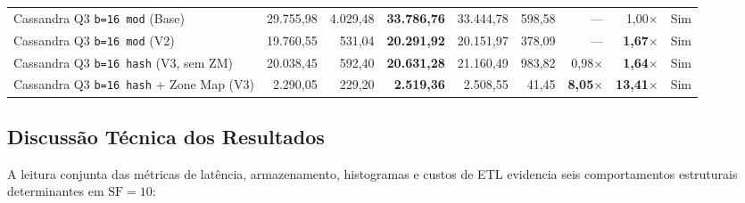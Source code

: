 \documentclass[12pt,a4paper]{article}
\begin{document}
\begin{table}[H]
\begin{adjustbox}{max width=\textwidth}
\begin{tabular}{lrrrrrrrc}
\midrule
Cassandra Q3 \texttt{b=16 mod} (Base) & 29.755,98 & 4.029,48 & \textbf{33.786,76} & 33.444,78 & 598,58 & --- & 1,00$\times$ & Sim \\
Cassandra Q3 \texttt{b=16 mod} (V2)   & 19.760,55 & 531,04   & \textbf{20.291,92} & 20.151,97 & 378,09 & --- & \textbf{1,67$\times$} & Sim \\
Cassandra Q3 \texttt{b=16 hash} (V3, sem ZM) & 20.038,45 & 592,40 & \textbf{20.631,28} & 21.160,49 & 983,82 & 0,98$\times$ & \textbf{1,64$\times$} & Sim \\
Cassandra Q3 \texttt{b=16 hash} + Zone Map (V3) & 2.290,05 & 229,20 & \textbf{2.519,36} & 2.508,55 & 41,45 & \textbf{8,05$\times$} & \textbf{13,41$\times$} & Sim \\
\bottomrule
\end{tabular}
\end{adjustbox}
\end{table}

\subsection{Discussão Técnica dos Resultados}
A leitura conjunta das métricas de latência, armazenamento, histogramas e custos de ETL evidencia seis comportamentos estruturais determinantes em $\text{SF}=10$:
\end{document}
